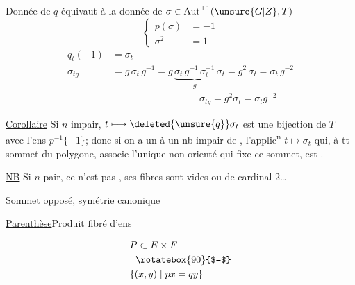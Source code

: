 Donnée de $q$ équivaut à la donnée de $\sigma\in\operatorname{Aut}^{\pm1}(\unsure{G|Z},T)$
\[
\left\{\begin{aligned}p(\sigma)&=-1\\ \sigma^2&=1\end{aligned}\right.
\]
\[
\begin{aligned}
q_t(-1)&=\sigma_t\\
\sigma_{tg}&=g\,\sigma_t\,g^{-1}
=g\,\underbrace{\sigma_t\,g^{-1}\,\sigma_t^{-1}}_{g}\,\sigma_t
=g^2\,\sigma_t=\sigma_t\,g^{-2}\\
&\hspace{9em}\boxed{\sigma_{tg}=g^2\sigma_t=\sigma_t g^{-2}}
\end{aligned}
\]

\uline{Corollaire} Si $n$ impair, $t\longmapsto\deleted{\unsure{q}}\sigma_t$ est une bijection de $T$ avec l'ens  $p^{-1}\{-1\}$; donc si on a un  à un nb impair de , l'applic\textsuperscript{n} $t\longmapsto\sigma_t$ qui, à tt sommet du polygone, associe l'unique  non orienté qui fixe ce sommet, est .

\uline{NB} Si $n$ pair,  ce n'est pas ,   ses fibres sont vides ou de cardinal 2\ldots


\uline{Sommet} \uline{opposé}, symétrie canonique

\uline{Parenthèse}\qquad Produit fibré d'ens

\noindent\begin{minipage}[c]{.46\linewidth}
\end{minipage}\hfill
\begin{minipage}[c]{.49\linewidth}
\[
\begin{aligned}
&P\subset E\times F\\
&\hspace{.6em}\rotatebox{90}{$=$}\\
&\{(x,y)\mid px=qy\}
\end{aligned}
\]
\end{minipage}


